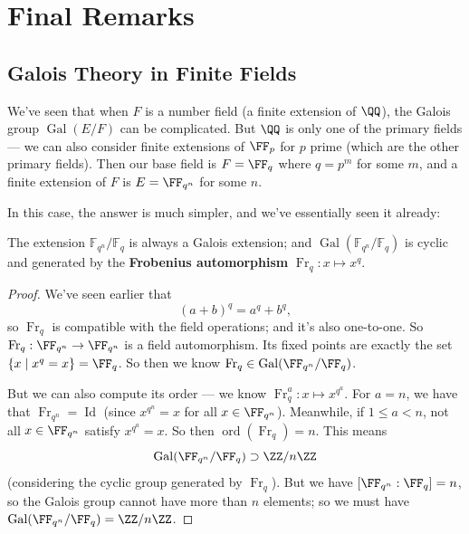 

\section{Final Remarks}

\subsection{Galois Theory in Finite Fields}

We've seen that when $F$ is a number field (a finite extension of $\QQ$), the Galois group $\operatorname{Gal}(E/F)$ can be complicated. But $\QQ$ is only one of the primary fields --- we can also consider finite extensions of $\FF_p$ for $p$ prime (which are the other primary fields). Then our base field is $F = \FF_q$ where $q = p^m$ for some $m$, and a finite extension of $F$ is $E = \FF_{q^n}$ for some $n$.

In this case, the answer is much simpler, and we've essentially seen it already:

\begin{theorem}
    The extension $\mathbb{F}_{q^n}/\mathbb{F}_q$ is always a Galois extension; and $\operatorname{Gal}(\mathbb{F}_{q^n}/\mathbb{F}_q)$ is cyclic and generated by the \textbf{Frobenius automorphism} $\operatorname{Fr}_q : x \mapsto x^q$. 
\end{theorem}

\begin{proof}
    We've seen earlier that \[(a + b)^q = a^q + b^q,\] so $\operatorname{Fr}_q$ is compatible with the field operations; and it's also one-to-one. So $\operatorname{Fr}_q : \FF_{q^n} \to \FF_{q^n}$ is a field automorphism. Its fixed points are exactly the set $\{x \mid x^q = x\} = \FF_q$. So then we know $\operatorname{Fr}_q \in \operatorname{Gal}(\FF_{q^n}/\FF_q)$. 
    
    But we can also compute its order --- we know $\operatorname{Fr}_q^a : x \mapsto x^{q^a}$. For $a = n$, we have that $\operatorname{Fr}_{q^n} = \operatorname{Id}$ (since $x^{q^n} = x$ for all $x \in \FF_{q^n}$). Meanwhile, if $1 \leq a < n$, not all $x \in \FF_{q^n}$ satisfy $x^{q^a} = x$. So then $\operatorname{ord}(\operatorname{Fr}_q) = n$. This means \[\operatorname{Gal}(\FF_{q^n}/\FF_q) \supset \ZZ/n\ZZ\] (considering the cyclic group generated by $\operatorname{Fr}_q$). But we have $[\FF_{q^n} : \FF_q] = n$, so the Galois group cannot have more than $n$ elements; so we must have $\operatorname{Gal}(\FF_{q^n}/\FF_q) = \ZZ/n\ZZ$. 
\end{proof}

